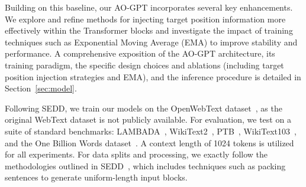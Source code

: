 Building on this baseline, our AO-GPT incorporates several key enhancements. We explore and refine methods for injecting target position information more effectively within the Transformer blocks and investigate the impact of training techniques such as Exponential Moving Average (EMA) to improve stability and performance.
A comprehensive exposition of the AO-GPT architecture, its training paradigm, the specific design choices and ablations (including target position injection strategies and EMA), and the inference procedure is detailed in Section~\ref{sec:model}.

Following SEDD, we train our models on the OpenWebText dataset~\cite{Gokaslan2019OpenWeb}, as the original WebText dataset is not publicly available. For evaluation, we test on a suite of standard benchmarks: LAMBADA~\cite{paperno2016lambada}, WikiText2~\cite{merity2016pointer}, PTB~\cite{marcus1993building}, WikiText103~\cite{merity2016pointer}, and the One Billion Words dataset~\cite{chelba2013one}. A context length of 1024 tokens is utilized for all experiments. For data splits and processing, we exactly follow the methodologies outlined in SEDD~\cite{lou2023discrete}, which includes techniques such as packing sentences to generate uniform-length input blocks.
